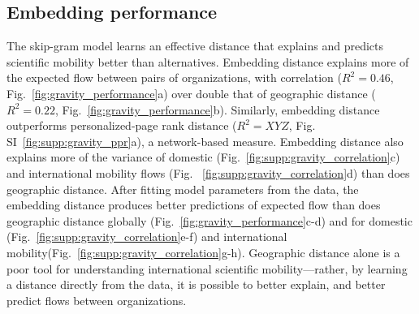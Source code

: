 \documentclass[12pt]{article} %
\begin{document}
%
%
\subsection*{Embedding performance}

The skip-gram model learns an effective distance that explains and predicts scientific mobility better than alternatives. 
Embedding distance explains more of the expected flow between pairs of organizations, with correlation ($R^{2} = 0.46$, Fig.~\ref{fig:gravity_performance}a) over double that of geographic distance ($R^{2} = 0.22$, Fig.~\ref{fig:gravity_performance}b).
Similarly, embedding distance outperforms personalized-page rank distance ($R^{2} = XYZ$, Fig. SI~\ref{fig:supp:gravity_ppr}a), a network-based measure. 
Embedding distance also explains more of the variance of domestic (Fig.~\ref{fig:supp:gravity_correlation}c) and international mobility flows (Fig. ~\ref{fig:supp:gravity_correlation}d) than does geographic distance. 
After fitting model parameters from the data, the embedding distance produces better predictions of expected flow than does geographic distance globally (Fig.~\ref{fig:gravity_performance}c-d) and for domestic (Fig.~\ref{fig:supp:gravity_correlation}e-f) and international mobility(Fig.~\ref{fig:supp:gravity_correlation}g-h).
Geographic distance alone is a poor tool for understanding international scientific mobility---rather, by learning a distance directly from the data, it is possible to better explain, and better predict flows between organizations. 
\end{document}
